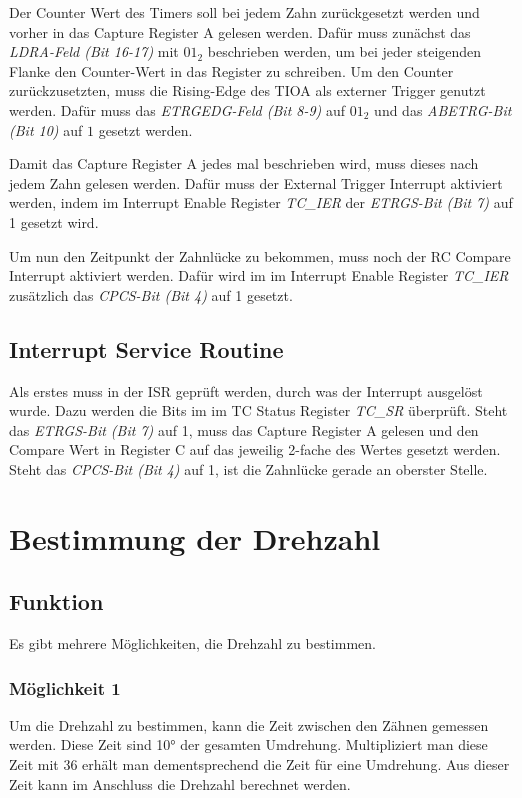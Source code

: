 \documentclass[12pt]{article}
\begin{document}
Der Counter Wert des Timers soll bei jedem Zahn zurückgesetzt werden und vorher in das Capture Register A gelesen werden. 
Dafür muss zunächst das \textit{LDRA-Feld (Bit 16-17)} mit $01_{2}$ beschrieben werden, um bei jeder steigenden Flanke den Counter-Wert in das Register zu schreiben.
Um den Counter zurückzusetzten, muss die Rising-Edge des TIOA als externer Trigger genutzt werden.
Dafür muss das \textit{ETRGEDG-Feld (Bit 8-9)} auf $01_2$ und das \textit{ABETRG-Bit (Bit 10)} auf $1$ gesetzt werden.

Damit das Capture Register A jedes mal beschrieben wird, muss dieses nach jedem Zahn gelesen werden.
Dafür muss der External Trigger Interrupt aktiviert werden, indem im Interrupt Enable Register \textit{TC\_IER} der \textit{ETRGS-Bit (Bit 7)} auf 1 gesetzt wird.

Um nun den Zeitpunkt der Zahnlücke zu bekommen, muss noch der RC Compare Interrupt aktiviert werden.
Dafür wird im im Interrupt Enable Register \textit{TC\_IER} zusätzlich das \textit{CPCS-Bit (Bit 4)} auf 1 gesetzt.

\subsection{Interrupt Service Routine}
Als erstes muss in der ISR geprüft werden, durch was der Interrupt ausgelöst wurde.
Dazu werden die Bits im im TC Status Register \textit{TC\_SR} überprüft.
Steht das \textit{ETRGS-Bit (Bit 7)} auf 1, muss das Capture Register A gelesen und den Compare Wert in Register C auf das jeweilig 2-fache des Wertes gesetzt werden.
Steht das \textit{CPCS-Bit (Bit 4)} auf 1, ist die Zahnlücke gerade an oberster Stelle.

\section{Bestimmung der Drehzahl}
\subsection{Funktion}
Es gibt mehrere Möglichkeiten, die Drehzahl zu bestimmen.

\subsubsection{Möglichkeit 1}
Um die Drehzahl zu bestimmen, kann die Zeit zwischen den Zähnen gemessen werden. Diese Zeit sind 10° der gesamten Umdrehung.
Multipliziert man diese Zeit mit 36 erhält man dementsprechend die Zeit für eine Umdrehung.
Aus dieser Zeit kann im Anschluss die Drehzahl berechnet werden.
\end{document}
